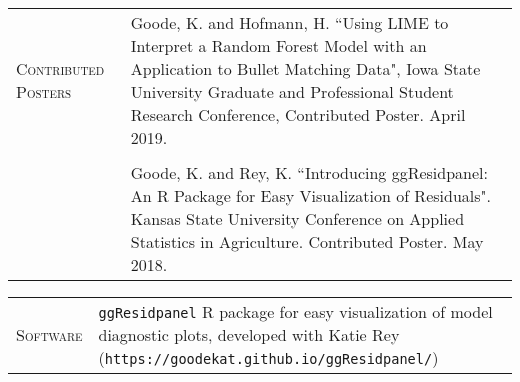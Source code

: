 \documentclass[11pt, oneside]{article}
\begin{document}
\vspace{0.5cm}

\noindent 
\begin{tabular}{p{3cm}p{14cm}}
\textsc{Contributed Posters} & Goode, K. and Hofmann, H. ``Using LIME to Interpret a Random Forest Model with an Application to Bullet Matching Data", Iowa State University Graduate and Professional Student Research Conference, Contributed Poster. April 2019.\\
\\ 
& Goode, K. and Rey, K. ``Introducing ggResidpanel: An R Package for Easy Visualization of Residuals". Kansas State University Conference on Applied Statistics in Agriculture. Contributed Poster. May 2018.
\end{tabular}

\vspace{0.5cm}

\noindent 
\begin{tabular}{p{3cm}p{14cm}}
\textsc{Software} & \texttt{ggResidpanel} R package for easy visualization of model diagnostic plots, developed with Katie Rey (\texttt{https://goodekat.github.io/ggResidpanel/})
\end{tabular}

\vspace{0.5cm}
\end{document}
